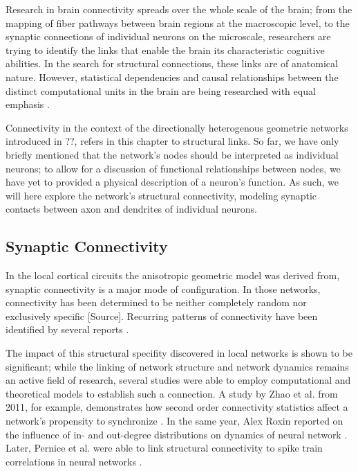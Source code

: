 Research in brain connectivity spreads over the whole scale  of the
brain; from the mapping of fiber pathways between brain regions at the
macroscopic level, to the synaptic connections of individual neurons
on the microscale, researchers are trying to identify the links that
enable the brain its characteristic cognitive abilities.
In the search for structural connections, these links are of
anatomical nature. However, statistical dependencies and causal
relationships between the distinct computational units in the brain
are being researched with equal emphasis \parencite{Scholarpedia-BrainConnectivity}.

Connectivity in the context of the directionally heterogenous
geometric networks introduced in ??, refers in this chapter to
structural links. So far, we have only briefly mentioned that the
network's nodes should be interpreted as individual neurons; to allow
for a discussion of functional relationships between nodes, we have yet
to provided a physical description of a neuron's function. As such, we
will here explore the network's structural connectivity, modeling
synaptic contacts between axon and dendrites of individual neurons.


\subsection*{Synaptic Connectivity}

In the local cortical circuits the anisotropic geometric model was
derived from, synaptic connectivity is a major mode of configuration.
In those networks, connectivity has been determined to be neither
completely random nor exclusively specific
[\textcolor{linkgrey}{Source}].%
Recurring patterns of connectivity have been identified by several
reports \parencite{Sporns2004,Song2005,Perin2011}.

The impact of this structural specifity discovered in local networks
is shown to be significant; while the linking of network structure and
network dynamics remains an active field of research, several studies
were able to employ computational and theoretical models to establish
such a connection. A study by Zhao et al. from 2011, for example,
demonstrates how second order connectivity statistics affect a
network's propensity to synchronize
\parencite{Zhao2011}. In the same year, Alex Roxin
reported on the influence of in- and out-degree distributions on
dynamics of neural network \parencite{Roxin2011}. Later,
Pernice et al. were able to link structural connectivity to spike
train correlations in neural networks
\parencite{Pernice2011}.


